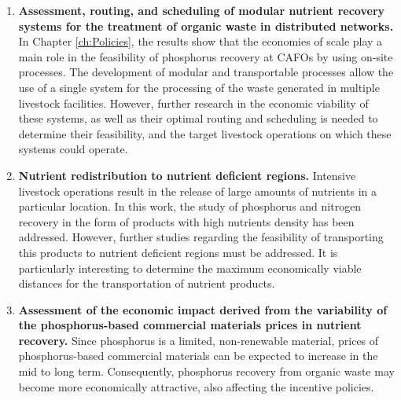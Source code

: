 \begin{enumerate}[font=\bfseries]
	\item \textbf{Assessment, routing, and scheduling of modular nutrient recovery systems for the treatment of organic waste in distributed networks.} In Chapter \ref{ch:Policies}, the results show that the economies of scale play a main role in the feasibility of phosphorus recovery at CAFOs by using on-site processes. The development of modular and transportable processes allow the use of a single system for the processing of the waste generated in multiple livestock facilities. However, further research in the economic viability of these systems, as well as their optimal routing and scheduling is needed to determine their feasibility, and the target livestock operations on which these systems could operate.
	
	\item \textbf{Nutrient redistribution to nutrient deficient regions.} Intensive livestock operations result in the release of large amounts of nutrients in a particular location. In this work, the study of phosphorus and nitrogen recovery in the form of products with high nutrients density has been addressed. However, further studies regarding the feasibility of transporting this products to nutrient deficient regions must be addressed. It is particularly interesting to determine the maximum economically viable distances for the transportation of nutrient products.
	
	\item \textbf{Assessment of the economic impact derived from the variability of the phosphorus-based commercial materials prices in nutrient recovery.} Since phosphorus is a limited, non-renewable material, prices of phosphorus-based commercial materials can be expected to increase in the mid to long term. Consequently, phosphorus recovery from organic waste may become more economically attractive, also affecting the incentive policies.
	

\end{enumerate}
